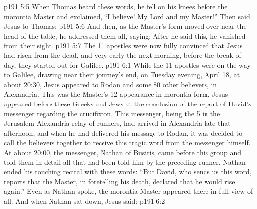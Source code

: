 \vs p191 5:5 When Thomas heard these words, he fell on his knees before the morontia Master and exclaimed, “I believe! My Lord and my Master!” Then said Jesus to Thomas: 
\vs p191 5:6 And then, as the Master’s form moved over near the head of the table, he addressed them all, saying:  After he said this, he vanished from their sight.
\vs p191 5:7 \pc The 11 apostles were now fully convinced that Jesus had risen from the dead, and very early the next morning, before the break of day, they started out for Galilee.
\vs p191 6:1 While the 11 apostles were on the way to Galilee, drawing near their journey’s end, on Tuesday evening, April 18, at about 20:30, Jesus appeared to Rodan and some 80 other believers, in Alexandria. This was the Master’s 12 appearance in morontia form. Jesus appeared before these Greeks and Jews at the conclusion of the report of David’s messenger regarding the crucifixion. This messenger, being the 5 in the Jerusalem\hyp{}Alexandria relay of runners, had arrived in Alexandria late that afternoon, and when he had delivered his message to Rodan, it was decided to call the believers together to receive this tragic word from the messenger himself. At about 20:00, the messenger, Nathan of Busiris, came before this group and told them in detail all that had been told him by the preceding runner. Nathan ended his touching recital with these words: “But David, who sends us this word, reports that the Master, in foretelling his death, declared that he would rise again.” Even as Nathan spoke, the morontia Master appeared there in full view of all. And when Nathan sat down, Jesus said:
\vs p191 6:2 
